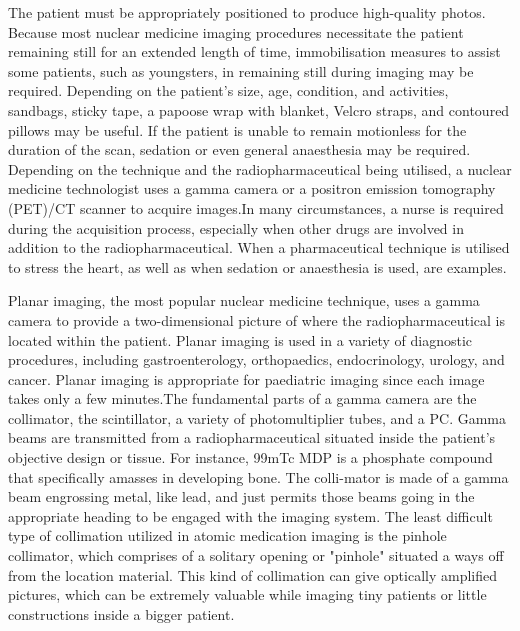 \documentclass[12pt]{article}
\begin{document}
\par
The patient must be appropriately positioned to produce high-quality photos. Because most nuclear medicine imaging procedures necessitate the patient remaining still for an extended length of time, immobilisation measures to assist some patients, such as youngsters, in remaining still during imaging may be required. Depending on the patient's size, age, condition, and activities, sandbags, sticky tape, a papoose wrap with blanket, Velcro straps, and contoured pillows may be useful. If the patient is unable to remain motionless for the duration of the scan, sedation or even general anaesthesia may be required. Depending on the technique and the radiopharmaceutical being utilised, a nuclear medicine technologist uses a gamma camera or a positron emission tomography (PET)/CT scanner to acquire images.In many circumstances, a nurse is required during the acquisition process, especially when other drugs are involved in addition to the radiopharmaceutical. When a pharmaceutical technique is utilised to stress the heart, as well as when sedation or anaesthesia is used, are examples.
\par
Planar imaging, the most popular nuclear medicine technique, uses a gamma camera to provide a two-dimensional picture of where the radiopharmaceutical is located within the patient. Planar imaging is used in a variety of diagnostic procedures, including gastroenterology, orthopaedics, endocrinology, urology, and cancer. Planar imaging is appropriate for paediatric imaging since each image takes only a few minutes.The fundamental parts of a gamma camera are the collimator, the scintillator, a variety of photomultiplier tubes, and a PC. Gamma beams are transmitted from a radiopharmaceutical situated inside the patient's objective design or tissue. For instance, 99mTc MDP is a phosphate compound that specifically amasses in developing bone. The colli-mator is made of a gamma beam engrossing metal, like lead, and just permits those beams going in the appropriate
heading to be engaged with the imaging system. The least difficult type of collimation utilized in atomic medication imaging is the pinhole collimator, which comprises of a solitary opening or "pinhole" situated a ways off from the location material. This kind of collimation can give optically amplified pictures, which can be extremely valuable while imaging tiny patients or little constructions inside a bigger patient.
\end{document}

